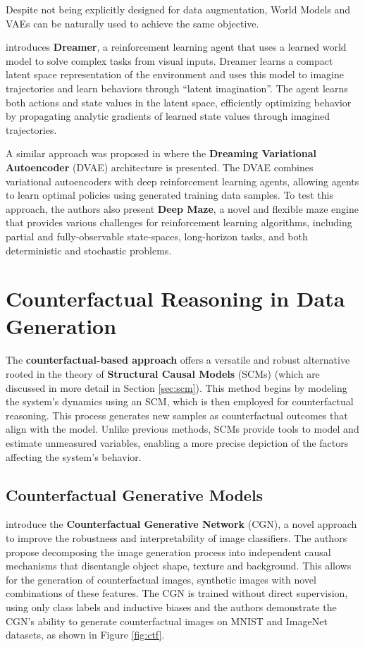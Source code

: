 Despite not being explicitly designed for data augmentation,
World Models and VAEs
can be naturally used to achieve the same objective.

\cite{hafner2020} 
introduces \textbf{Dreamer}, a reinforcement learning
agent that uses a learned world model to solve complex
tasks from visual inputs. Dreamer learns a compact
latent space representation of the environment and
uses this model to imagine trajectories and learn
behaviors through ``latent imagination''.
The agent learns both actions and state values in the
latent space, efficiently optimizing behavior
by propagating analytic gradients of learned
state values through imagined trajectories.

A similar approach was proposed in \cite{andersen2018}
where the \textbf{Dreaming Variational Autoencoder} (DVAE)
architecture is presented.
The DVAE combines variational autoencoders
with deep reinforcement learning agents,
allowing agents to learn optimal policies using
generated training data samples. To test this approach,
the authors also present \textbf{Deep Maze}, a novel and flexible
maze engine that provides various challenges
for reinforcement learning algorithms,
including partial and fully-observable state-spaces,
long-horizon tasks, and both deterministic and
stochastic problems.

\section{Counterfactual Reasoning in Data Generation}

The \textbf{counterfactual-based approach} offers a
versatile and robust alternative rooted in
the theory of \textbf{Structural Causal Models} (SCMs) 
(which are discussed in more detail in Section
\ref{sec:scm}).
This method begins by modeling the system's
dynamics using an SCM, which is then employed
for counterfactual reasoning. This process generates
new samples as counterfactual outcomes that align with
the model. Unlike previous methods, SCMs provide
tools to model and estimate unmeasured variables,
enabling a more precise depiction of the factors
affecting the system's behavior.

\subsection{Counterfactual Generative Models}

\cite{sauer2021} introduce the
\textbf{Counterfactual Generative Network} (CGN),
a novel approach to improve the robustness and
interpretability of image classifiers.
The authors propose decomposing the image
generation process into independent causal
mechanisms that disentangle object shape, texture
and background. This allows for the generation of
counterfactual images, synthetic images with novel
combinations of these features.
The CGN is trained without direct supervision,
using only class labels and inductive biases and
the authors demonstrate the CGN's ability to
generate counterfactual images
on MNIST and ImageNet datasets, as shown
in Figure \ref{fig:ctf}.

